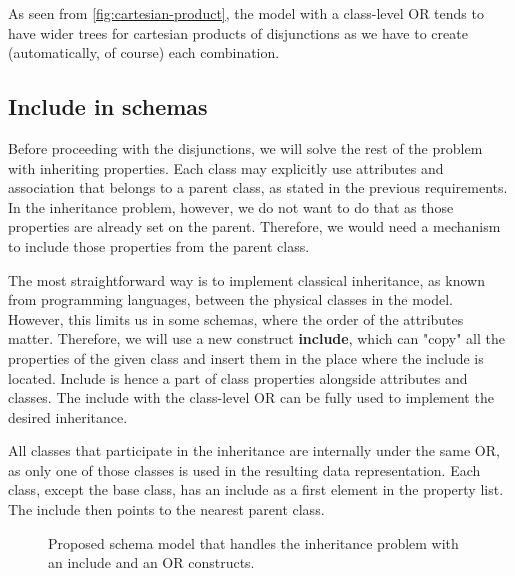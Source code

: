 As seen from \autoref{fig:cartesian-product}, the model with a class-level OR tends to have wider trees for cartesian products of disjunctions as we have to create (automatically, of course) each combination.

\subsection{Include in schemas}

Before proceeding with the disjunctions, we will solve the rest of the problem with inheriting properties. Each class may explicitly use attributes and association that belongs to a parent class, as stated in the previous requirements. In the inheritance problem, however, we do not want to do that as those properties are already set on the parent. Therefore, we would need a mechanism to include those properties from the parent class.

The most straightforward way is to implement classical inheritance, as known from programming languages, between the physical classes in the model. However, this limits us in some schemas, where the order of the attributes matter. Therefore, we will use a new construct \textbf{include}, which can "copy" all the properties of the given class and insert them in the place where the include is located. Include is hence a part of class properties alongside attributes and classes. The include with the class-level OR can be fully used to implement the desired inheritance.

All classes that participate in the inheritance are internally under the same OR, as only one of those classes is used in the resulting data representation. Each class, except the base class, has an include as a first element in the property list. The include then points to the nearest parent class.

\begin{figure}[h!]\centering
  \centering

    \caption{Proposed schema model that handles the inheritance problem with an include and an OR constructs.}
  \end{figure}

